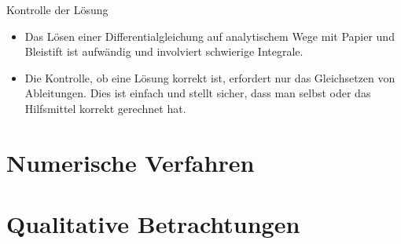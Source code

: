 \documentclass[notheorems,hidelinks,aspectratio=1610]{beamer}
\begin{document}
\begin{frame}{Kontrolle der Lösung}
  \begin{itemize}
  \item Das Lösen einer Differentialgleichung auf analytischem Wege mit
  \glqq{}Papier und Bleistift\grqq{} ist aufwändig und involviert
  schwierige Integrale.
\item Die Kontrolle, ob eine Lösung korrekt ist, erfordert nur das
  Gleichsetzen von Ableitungen. Dies ist einfach und stellt sicher,
  dass man selbst oder das Hilfsmittel korrekt gerechnet hat.
  \end{itemize}
\end{frame}

\section{Numerische Verfahren}
\frame{\sectoc}

\section{Qualitative Betrachtungen}
\frame{\sectoc}
\end{document}
